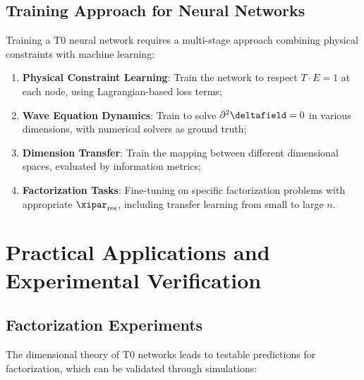 	\subsection{Training Approach for Neural Networks}
	\label{subsec:training_approach}
	
	Training a T0 neural network requires a multi-stage approach combining physical constraints with machine learning:
	
	\begin{enumerate}
		\item \textbf{Physical Constraint Learning}: Train the network to respect $T \cdot E = 1$ at each node, using Lagrangian-based loss terms;
		\item \textbf{Wave Equation Dynamics}: Train to solve $\partial^2 \deltafield = 0$ in various dimensions, with numerical solvers as ground truth;
		\item \textbf{Dimension Transfer}: Train the mapping between different dimensional spaces, evaluated by information metrics;
		\item \textbf{Factorization Tasks}: Fine-tuning on specific factorization problems with appropriate $\xipar_{\text{res}}$, including transfer learning from small to large $n$.
	\end{enumerate}
	
	\section{Practical Applications and Experimental Verification}
	\label{sec:practical_applications}
	
	\subsection{Factorization Experiments}
	\label{subsec:factorization_experiments}
	
	The dimensional theory of T0 networks leads to testable predictions for factorization, which can be validated through simulations:
	
	\begin{table}[htbp]
		\centering
		\caption{Factorization predictions from the dimensional T0 theory, extended with validation metrics}
		\label{tab:factorization_predictions}
	\end{table}
	
